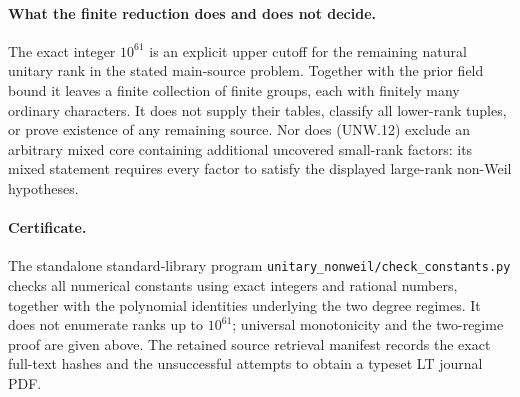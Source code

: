 \paragraph{What the finite reduction does and does not decide.}
The exact integer $10^{61}$ is an explicit upper cutoff for the
remaining natural unitary rank in the stated main-source problem.
Together with the prior field bound it leaves a finite collection
of finite groups, each with finitely many ordinary characters.
It does not supply their tables, classify all lower-rank tuples,
or prove existence of any remaining source.  Nor does (UNW.12)
exclude an arbitrary mixed core containing additional uncovered
small-rank factors: its mixed statement requires every factor
to satisfy the displayed large-rank non-Weil hypotheses.

\paragraph{Certificate.}
The standalone standard-library program
\texttt{unitary\_nonweil/check\_constants.py} checks all numerical
constants using exact integers and rational numbers, together
with the polynomial identities underlying the two degree regimes.
It does not enumerate ranks up to $10^{61}$; universal monotonicity
and the two-regime proof are given above.  The retained source
retrieval manifest records the exact full-text hashes and the
unsuccessful attempts to obtain a typeset LT journal PDF.
